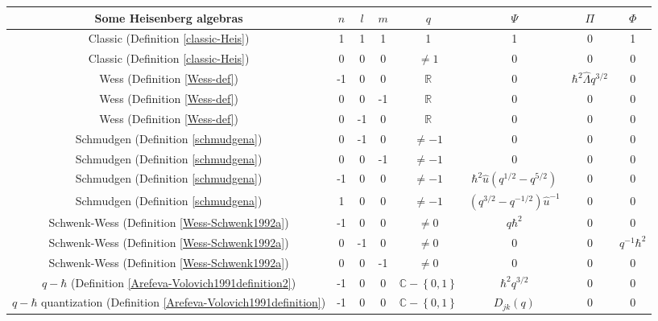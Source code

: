 \documentclass[12pt,a4paper]{article}
\theoremstyle{plain}
\theoremstyle{definition}
\theoremstyle{remark}
\begin{document}
\begin{landscape}  
\begin{table}[ht]
\centering
\begin{tabular}{|c|c|c|c|c|c|c|c|} %
  \hline
    \bf{Some Heisenberg algebras}  & $n$ & $l$ & $m$ & $q$ & $\Psi$ & $\Pi$ & $\Phi$ \\ \hline
  Classic (Definition \ref{classic-Heis}) & 1  & 1 & 1 & 1 & 1 & 0 & 1\\ \hline
  Classic (Definition \ref{classic-Heis}) & 0 & 0 & 0 & $\neq 1$ & 0 & 0 & 0\\ \hline
  Wess (Definition \ref{Wess-def}) & -1 & 0 & 0  &  $\mathbb{R}$ & 0 & $\hbar^{2}\hat{\Lambda}q^{3/2}$ & 0 \\ \hline
  Wess (Definition \ref{Wess-def}) & 0 & 0 & -1 & $\mathbb{R}$ & 0 & 0 & 0\\ \hline
  Wess (Definition \ref{Wess-def}) & 0 & -1 & 0 & $\mathbb{R}$ & 0 & 0 & 0\\ \hline
  Schmudgen (Definition \ref{schmudgena})  & 0 & -1 & 0 & $\neq -1$ & 0 & 0 & 0\\ \hline
  Schmudgen (Definition \ref{schmudgena}) & 0 & 0 & -1 & $\neq -1$ & 0 & 0 & 0\\ \hline
  Schmudgen (Definition \ref{schmudgena}) & -1 & 0 & 0 & $\neq -1$ & $\hbar^{2}\hat{u}(q^{1/2}-q^{5/2})$ & 0 & 0\\ \hline
  Schmudgen (Definition \ref{schmudgena}) & 1 & 0 & 0 & $\neq -1$ & $(q^{3/2}-q^{-1/2})\hat{u}^{-1}$ & 0 & 0 \\ \hline
  Schwenk-Wess (Definition \ref{Wess-Schwenk1992a}) & -1 & 0 & 0 & $\neq 0$ & $q\hbar^{2}$ & 0 & 0\\ \hline
  Schwenk-Wess (Definition \ref{Wess-Schwenk1992a}) & 0 & -1 & 0 & $\neq 0$ & 0 & 0 & $q^{-1}\hbar^{2}$\\ \hline
   Schwenk-Wess (Definition \ref{Wess-Schwenk1992a}) & 0 & 0 & -1 & $\neq 0$ & 0 & 0 & 0\\ \hline
  $q-\hbar$ (Definition \ref{Arefeva-Volovich1991definition2}) & -1 & 0 & 0 & $\mathbb{C}-\left\lbrace 0,1\right\rbrace$ & $\hbar^{2}q^{3/2}$ & 0 & 0\\ \hline
  $q- \hbar$ quantization (Definition \ref{Arefeva-Volovich1991definition}) & -1 & 0 & 0 & $\mathbb{C}-\left\lbrace 0,1\right\rbrace$ & $D_{jk}(q)$ & 0 & 0\\ \hline
  

\end{tabular}
\end{table}
\end{landscape}
\end{document}
